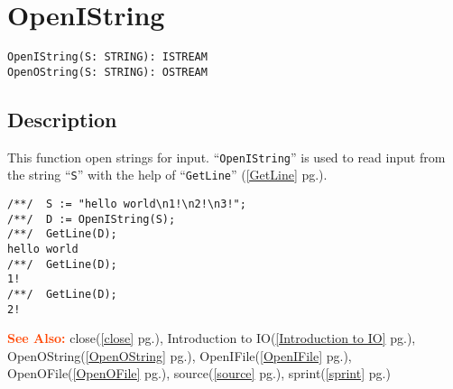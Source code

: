 \documentclass[a4paper]{mybook}
\newenvironment{command}{}{} %
\newcommand\SeeAlso{\par\textcolor{OrangeRed}{\textbf{\large See Also: }}}
\begin{document}
\section{OpenIString}
\label{OpenIString}
\begin{command} %


\begin{Verbatim}[label=syntax, rulecolor=\color{MidnightBlue},
frame=single]
OpenIString(S: STRING): ISTREAM
OpenOString(S: STRING): OSTREAM
\end{Verbatim}


\subsection*{Description}

This function open strings for input.
``\verb&OpenIString&'' is used to read input from the
string ``\verb&S&'' with the help of ``\verb&GetLine&'' (\ref{GetLine} pg.\pageref{GetLine}).
\begin{Verbatim}[label=example, rulecolor=\color{PineGreen}, frame=single]
/**/  S := "hello world\n1!\n2!\n3!";
/**/  D := OpenIString(S);
/**/  GetLine(D);
hello world
/**/  GetLine(D);
1!
/**/  GetLine(D);
2!
\end{Verbatim}


\SeeAlso %
  close(\ref{close} pg.\pageref{close}), 
    Introduction to IO(\ref{Introduction to IO} pg.\pageref{Introduction to IO}), 
    OpenOString(\ref{OpenOString} pg.\pageref{OpenOString}), 
    OpenIFile(\ref{OpenIFile} pg.\pageref{OpenIFile}), 
    OpenOFile(\ref{OpenOFile} pg.\pageref{OpenOFile}), 
    source(\ref{source} pg.\pageref{source}), 
    sprint(\ref{sprint} pg.\pageref{sprint})
\end{command} %
\end{document}
